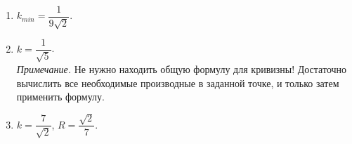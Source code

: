 \documentclass[a4paper,12pt]{article}
\begin{document}
\begin{enumerate}
     	\item $k_{min} = \dfrac{1}{9 \sqrt{2}}$.
     	
     	\item $k = \dfrac{1}{\sqrt{5}}$. \\
     	\textit{Примечание.} Не нужно находить общую формулу для кривизны! Достаточно вычислить все необходимые производные в заданной точке, и только затем применить формулу.
     	 
     	\item $k = \dfrac{7}{\sqrt{2}}$, $R = \dfrac{\sqrt{2}}{7}$.
\end{enumerate}
\end{document}

